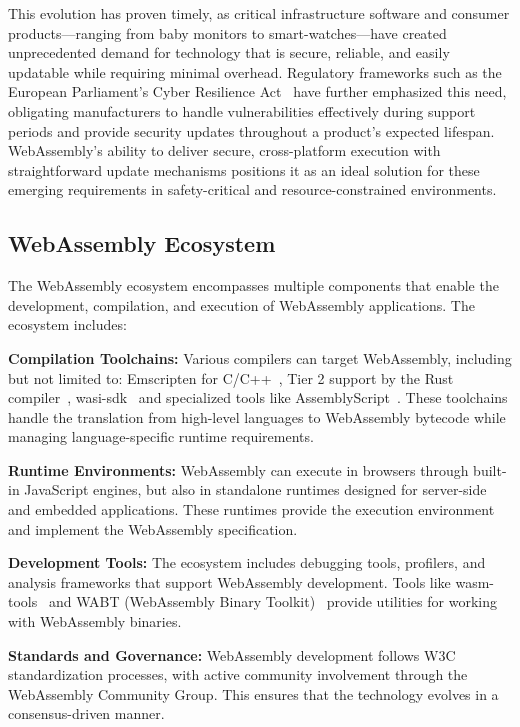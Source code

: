 This evolution has proven timely, as critical infrastructure software and consumer products—ranging from baby monitors to smart-watches—have created unprecedented demand for technology that is secure, reliable, and easily updatable while requiring minimal overhead. Regulatory frameworks such as the European Parliament's Cyber Resilience Act~\cite{eu_cyber_res_act} have further emphasized this need, obligating manufacturers to handle vulnerabilities effectively during support periods and provide security updates throughout a product's expected lifespan. WebAssembly's ability to deliver secure, cross-platform execution with straightforward update mechanisms positions it as an ideal solution for these emerging requirements in safety-critical and resource-constrained environments.

\subsection{WebAssembly Ecosystem}
\label{subsec:wasm-ecosystem}

The WebAssembly ecosystem encompasses multiple components that enable the development, compilation, and execution of WebAssembly applications. The ecosystem includes:

\textbf{Compilation Toolchains:} Various compilers can target WebAssembly, including but not limited to: Emscripten for C/C++~\cite{emscripten_git}, Tier 2 support by the Rust compiler~\cite{rust_wasm_target}, wasi-sdk~\cite{wasisdk} and specialized tools like AssemblyScript~\cite{assemblyscript_git}. These toolchains handle the translation from high-level languages to WebAssembly bytecode while managing language-specific runtime requirements.

\textbf{Runtime Environments:} WebAssembly can execute in browsers through built-in JavaScript engines, but also in standalone runtimes designed for server-side and embedded applications. These runtimes provide the execution environment and implement the WebAssembly specification.

\textbf{Development Tools:} The ecosystem includes debugging tools, profilers, and analysis frameworks that support WebAssembly development. Tools like wasm-tools~\cite{wasm_tools_git} and WABT (WebAssembly Binary Toolkit)~\cite{wabt_git} provide utilities for working with WebAssembly binaries.

\textbf{Standards and Governance:} WebAssembly development follows W3C standardization processes, with active community involvement through the WebAssembly Community Group. This ensures that the technology evolves in a consensus-driven manner.

